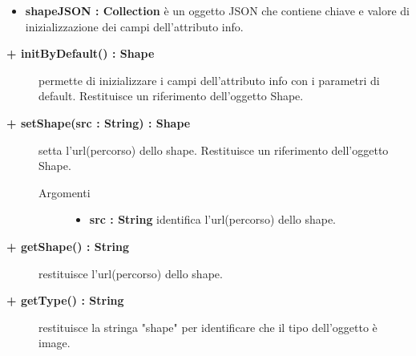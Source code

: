 \begin{description}
\begin{description}
\begin{description}
\begin{itemize}
					\item \textbf{shapeJSON : Collection			} \hfill
					è un oggetto JSON che contiene chiave e valore di inizializzazione dei campi dell'attributo info. 
				\end{itemize}
		\end{description}

\end{description}

\begin{description}
		\item[\textbf{\color{blue}+ initByDefault() : Shape			}] \hfill
			permette di inizializzare i campi dell'attributo info con i parametri di default. Restituisce un riferimento dell'oggetto Shape. 

\end{description}

\begin{description}
		\item[\textbf{\color{blue}+ setShape(src : String) : Shape			}] \hfill
			setta l'url(percorso) dello shape. Restituisce un riferimento dell'oggetto Shape.
			
		\begin{description}
			\item[Argomenti] \hfill
				\begin{itemize}
				
					\item \textbf{src : String			} \hfill
					identifica l'url(percorso) dello shape.
				\end{itemize}
		\end{description}

\end{description}

\begin{description}
		\item[\textbf{\color{blue}+ getShape() : String			}] \hfill
			restituisce l'url(percorso) dello shape. 

\end{description}

\begin{description}
		\item[\textbf{\color{blue}+ getType() : String			}] \hfill
			restituisce la stringa "shape" per identificare che il tipo dell'oggetto è image. 

\end{description}



\end{description}


